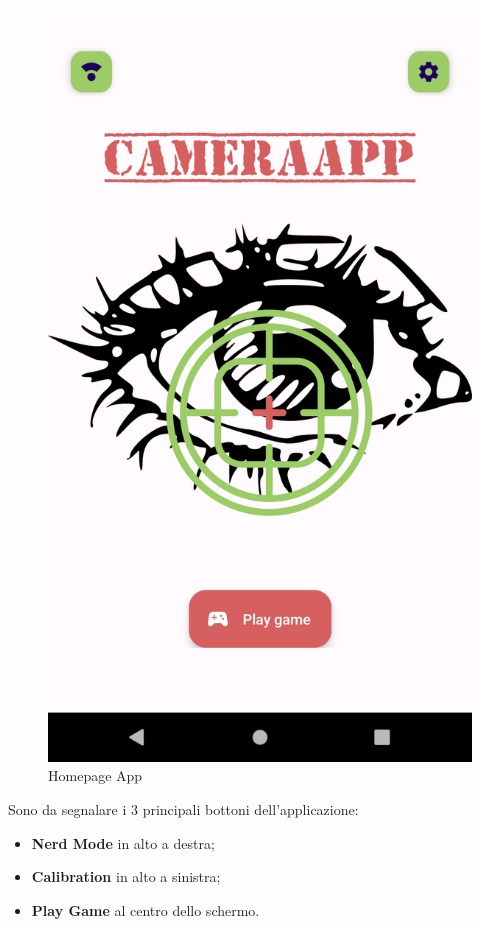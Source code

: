 \documentclass[11pt]{article}
\begin{document}
\begin{figure}[h]
\caption{Homepage App }
\centering
\includegraphics[scale=0.18]{img/home.png}
\end{figure}

Sono da segnalare i 3 principali bottoni dell'applicazione:
\begin{itemize}
\item \textbf{Nerd Mode} in alto a destra;
\item \textbf{Calibration} in alto a sinistra;
\item \textbf{Play Game} al centro dello schermo.
\end{itemize}
\end{document}
